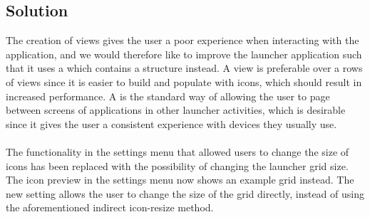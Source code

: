 \subsection{Solution}
\label{sub:reengineering_of_application_grid_solution}
The creation of  views gives the user a poor experience when interacting with the application, and we would therefore like to improve the launcher application such that it uses a  which contains a  structure instead. A  view is preferable over a rows of  views since it is easier to build and populate with icons, which should result in increased performance. A  is the standard way of allowing the user to page between screens of applications in other launcher activities, which is desirable since it gives the user a consistent experience with devices they usually use. 
\\\\
The functionality in the settings menu that allowed users to change the size of icons has been replaced with the possibility of changing the launcher grid size. The icon preview in the settings menu now shows an example grid instead. The new setting allows the user to change the size of the grid directly, instead of using the aforementioned indirect icon-resize method. 